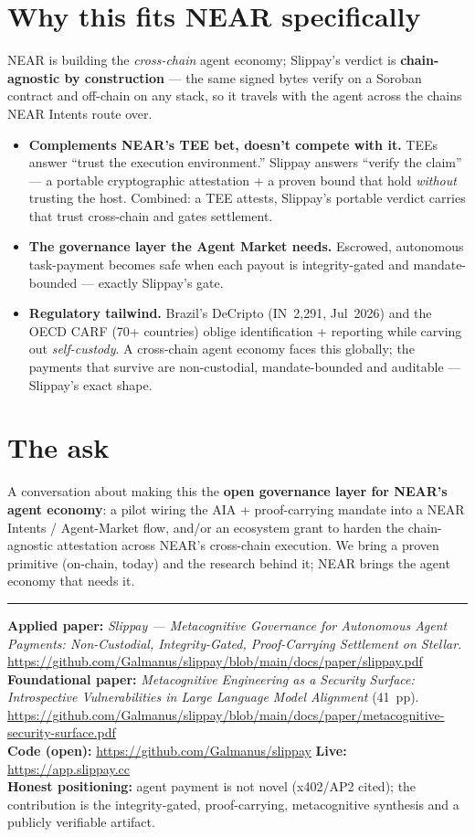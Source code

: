 \documentclass[11pt]{article}
\begin{document}
\section*{Why this fits NEAR specifically}
NEAR is building the \emph{cross-chain} agent economy; Slippay's verdict is \textbf{chain-agnostic
by construction} --- the same signed bytes verify on a Soroban contract and off-chain on any
stack, so it travels with the agent across the chains NEAR Intents route over.
\begin{itemize}
  \item \textbf{Complements NEAR's TEE bet, doesn't compete with it.} TEEs answer ``trust the
  execution environment.'' Slippay answers ``verify the claim'' --- a portable cryptographic
  attestation + a proven bound that hold \emph{without} trusting the host. Combined: a TEE
  attests, Slippay's portable verdict carries that trust cross-chain and gates settlement.
  \item \textbf{The governance layer the Agent Market needs.} Escrowed, autonomous task-payment
  becomes safe when each payout is integrity-gated and mandate-bounded --- exactly Slippay's gate.
  \item \textbf{Regulatory tailwind.} Brazil's DeCripto (IN~2{,}291, Jul~2026) and the OECD CARF
  (70+ countries) oblige identification + reporting while carving out \emph{self-custody}. A
  cross-chain agent economy faces this globally; the payments that survive are non-custodial,
  mandate-bounded and auditable --- Slippay's exact shape.
\end{itemize}

\section*{The ask}
A conversation about making this the \textbf{open governance layer for NEAR's agent economy}: a
pilot wiring the AIA + proof-carrying mandate into a NEAR Intents / Agent-Market flow, and/or an
ecosystem grant to harden the chain-agnostic attestation across NEAR's cross-chain execution. We
bring a proven primitive (on-chain, today) and the research behind it; NEAR brings the agent
economy that needs it.

\medskip\hrule\medskip
\small
\textbf{Applied paper:} \emph{Slippay --- Metacognitive Governance for Autonomous Agent Payments:
Non-Custodial, Integrity-Gated, Proof-Carrying Settlement on Stellar.}
\url{https://github.com/Galmanus/slippay/blob/main/docs/paper/slippay.pdf}\\
\textbf{Foundational paper:} \emph{Metacognitive Engineering as a Security Surface: Introspective
Vulnerabilities in Large Language Model Alignment} (41~pp).
\url{https://github.com/Galmanus/slippay/blob/main/docs/paper/metacognitive-security-surface.pdf}\\
\textbf{Code (open):} \url{https://github.com/Galmanus/slippay} \;\textbar\;
\textbf{Live:} \url{https://app.slippay.cc}\\
\textbf{Honest positioning:} agent payment is not novel (x402/AP2 cited); the contribution is the
integrity-gated, proof-carrying, metacognitive synthesis and a publicly verifiable artifact.
\end{document}
